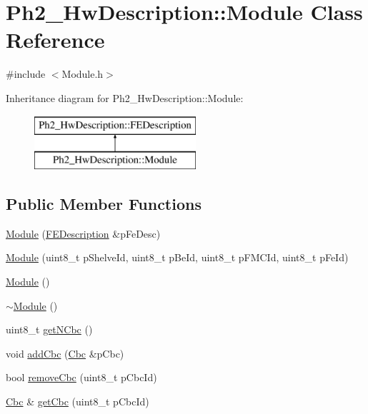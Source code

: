 \hypertarget{class_ph2___hw_description_1_1_module}{\section{Ph2\-\_\-\-Hw\-Description\-:\-:Module Class Reference}
\label{class_ph2___hw_description_1_1_module}
}


{\ttfamily \#include $<$Module.\-h$>$}

Inheritance diagram for Ph2\-\_\-\-Hw\-Description\-:\-:Module\-:\begin{figure}[H]
\begin{center}
\leavevmode
\includegraphics[height=2.000000cm]{class_ph2___hw_description_1_1_module}
\end{center}
\end{figure}
\subsection*{Public Member Functions}
\begin{DoxyCompactItemize}
\item 
\hyperlink{class_ph2___hw_description_1_1_module_a7429c4855bd0a17350b9dd47b760a676}{Module} (\hyperlink{class_ph2___hw_description_1_1_f_e_description}{F\-E\-Description} \&p\-Fe\-Desc)
\item 
\hyperlink{class_ph2___hw_description_1_1_module_ab02f91e3a7089e2b47883bacec242250}{Module} (uint8\-\_\-t p\-Shelve\-Id, uint8\-\_\-t p\-Be\-Id, uint8\-\_\-t p\-F\-M\-C\-Id, uint8\-\_\-t p\-Fe\-Id)
\item 
\hyperlink{class_ph2___hw_description_1_1_module_aaec7dd439bdf7a1db3f2136569a00125}{Module} ()
\item 
\hyperlink{class_ph2___hw_description_1_1_module_a8142f34ea2308ed78e8d0dbb042bc5f3}{$\sim$\-Module} ()
\item 
uint8\-\_\-t \hyperlink{class_ph2___hw_description_1_1_module_a8703442b1055c0c38b4157fc155ac084}{get\-N\-Cbc} ()
\item 
void \hyperlink{class_ph2___hw_description_1_1_module_ac2743d5056bc3053bf472e5fd94bbf14}{add\-Cbc} (\hyperlink{class_ph2___hw_description_1_1_cbc}{Cbc} \&p\-Cbc)
\item 
bool \hyperlink{class_ph2___hw_description_1_1_module_a0aa7c940311bd13a32fd4e0f251c2d27}{remove\-Cbc} (uint8\-\_\-t p\-Cbc\-Id)
\item 
\hyperlink{class_ph2___hw_description_1_1_cbc}{Cbc} \& \hyperlink{class_ph2___hw_description_1_1_module_a5e2539a7fc4982e150e90e2d09f99dfe}{get\-Cbc} (uint8\-\_\-t p\-Cbc\-Id)
\end{DoxyCompactItemize}

